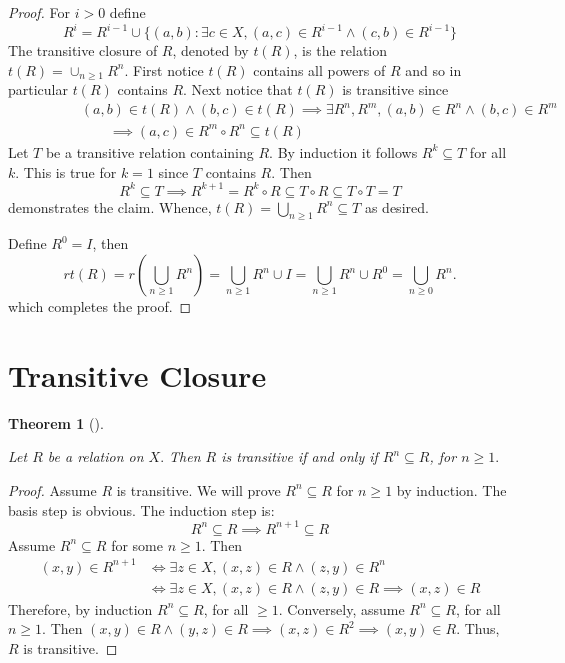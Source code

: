 \documentclass[
  letterpaper,
  10pt,
  reqno,
  twopage,
  openany]{book}
\theoremstyle{plain}
\theoremstyle{definition}
\theoremstyle{definition}
\theoremstyle{definition}
\theoremstyle{plain}
\theoremstyle{plain}
\newtheorem{theorem}{Theorem}[chapter]
\theoremstyle{remark}
\begin{document}
\begin{proof}

For \(i>0\) define \[
R^i=R^{i-1}\cup \{(a,b) : \exists c\in X, (a,c)\in R^{i-1} \land (c,b)\in R^{i-1}\}
\] The transitive closure of \(R\), denoted by \(t(R)\), is the relation
\(t(R)=\cup_{n\geq 1} R^n.\) First notice \(t(R)\) contains all powers
of \(R\) and so in particular \(t(R)\) contains \(R.\) Next notice that
\(t(R)\) is transitive since \begin{align*}
\qquad \qquad & (a,b)\in t(R) \land (b,c)\in t(R) 
\implies \exists R^n, R^m, (a,b)\in R^n \land (b,c)\in R^m
\\ & \qquad \implies (a,c) \in R^m\circ R^n\subseteq t(R)
\end{align*} Let \(T\) be a transitive relation containing \(R.\) By
induction it follows \(R^k\subseteq T\) for all \(k.\) This is true for
\(k=1\) since \(T\) contains \(R.\) Then \[
R^k\subseteq T 
\implies R^{k+1}
=R^{k}\circ R
\subseteq T\circ R
\subseteq T \circ T 
=T
\] demonstrates the claim. Whence,
\(t(R)=\bigcup_{n\geq 1}R^n\subseteq T\) as desired.

\par

Define \(R^0=I\), then \[
rt(R)=r\left(\bigcup_{n\geq1}R^n\right)
= \bigcup_{n\geq1}R^n\cup I 
= \bigcup_{n\geq1}R^n \cup R^0
= \bigcup_{n\geq0}R^n.
\] which completes the proof.

\end{proof}

\hypertarget{transitive-closure}{%
\section{Transitive Closure}\label{transitive-closure}}

\leavevmode{}%
\begin{theorem}[]\label{thm-transitive-powers}

Let \(R\) be a relation on \(X.\) Then \(R\) is transitive if and only
if \(R^n\subseteq R\), for \(n\geq 1.\)

\end{theorem}

\begin{proof}

Assume \(R\) is transitive. We will prove \(R^n \subseteq R\) for
\(n\geq 1\) by induction. The basis step is obvious. The induction step
is: \[
R^n\subseteq R \implies R^{n+1}\subseteq R
\] Assume \(R^n\subseteq R\) for some \(n\geq 1.\) Then \begin{align*}
(x,y)\in R^{n+1} 
& \Leftrightarrow \exists z\in X, (x,z)\in R \land (z,y)\in R^n 
\\ & \Leftrightarrow \exists z\in X, (x,z)\in R \land (z,y)\in R 
\implies (x,z)\in R 
\end{align*} Therefore, by induction \(R^n\subseteq R\), for all
\(\geq 1.\) Conversely, assume \(R^n\subseteq R\), for all \(n\geq 1.\)
Then
\((x,y)\in R\land (y,z)\in R \implies (x,z)\in R^2 \implies (x,y)\in R.\)
Thus, \(R\) is transitive.

\end{proof}
\end{document}
